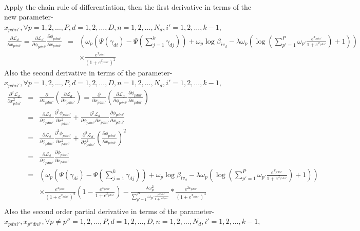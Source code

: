 \documentclass[a4paper]{article}
\newcommand{\be}{\begin{equation}}
\newcommand{\ee}{\end{equation}}
\newcommand{\ba}{\begin{array}}
\newcommand{\ea}{\end{array}}
\begin{document}
\\
Apply the chain rule of differentiation, then the first derivative in terms of the new parameter-$x_{pdni'},\forall p=1,2,\ldots,P,d=1,2,\ldots,D,n=1,2,\ldots,N_d,i'=1,2,\ldots,k-1$,\\
\be
\ba{rcl}
\frac{\partial\mathcal{L}_d}{\partial x_{pdni'}}=\frac{\partial\mathcal{L}_d}{\partial \phi_{pdni'}}\frac{\partial\phi_{pdni'}}{\partial x_{pdni'}}&=&\left(\omega_{p}(\Psi(\gamma_{di})-\Psi(\sum_{j=1}^{k}\gamma_{dj}))+\omega_{p}\log\beta_{iv_d}-\lambda\omega_{p}(\log(\sum_{p'=1}^{P}\omega_{p'}\frac{e^{x_{pdni'}}}{1+e^{x_{pdni'}}})+1)\right)\\
&&\times\frac{e^{x_{pdni'}}}{(1+e^{x_{pdni'}})^2}
\ea
\ee
 Also the second derivative in terms of the parameter-$x_{pdni'},\forall p=1,2,\ldots,P,d=1,2,\ldots,D,n=1,2,\ldots,N_d,i'=1,2,\ldots,k-1$,\\
 \be
 \ba{rcl}
 \frac{\partial^2\mathcal{L}_d}{\partial x_{pdni'}^2}&=&\frac{\partial}{\partial x_{pdni'}}\left(\frac{\partial\mathcal{L}_d}{\partial x_{pdni'}}\right)=\frac{\partial}{\partial x_{pdni'}}\left(\frac{\partial\mathcal{L}_d}{\partial \phi_{pdni'}}\frac{\partial\phi_{pdni'}}{\partial x_{pdni'}}\right)\\
 &=&\frac{\partial\mathcal{L}_d}{\partial \phi_{pdni'}}\frac{\partial^2\phi_{pdni'}}{\partial x_{pdni'}^2}+\frac{\partial^2\mathcal{L}_d}{\partial \phi_{pdni'}\partial x_{pdni'}}\frac{\partial\phi_{pdni'}}{\partial x_{pdni'}}\\
 &=&\frac{\partial\mathcal{L}_d}{\partial \phi_{pdni'}}\frac{\partial^2\phi_{pdni'}}{\partial x_{pdni'}^2}+\frac{\partial^2\mathcal{L}_d}{\partial \phi_{pdni'}^2}(\frac{\partial\phi_{pdni'}}{\partial x_{pdni'}})^2\\
 &=&\frac{\partial\mathcal{L}_d}{\partial \phi_{pdni'}}\frac{\partial\phi_{pdni'}}{\partial x_{pdni'}}\\
 &=&\left(\omega_{p}(\Psi(\gamma_{di})-\Psi(\sum_{j=1}^{k}\gamma_{dj}))+\omega_{p}\log\beta_{iv_d}-\lambda\omega_{p}(\log(\sum_{p'=1}^{P}\omega_{p'}\frac{e^{x_{p'dni'}}}{1+e^{x_{p'dni'}}})+1)\right)\\
 &&\times\frac{e^{x_{pdni'}}}{(1+e^{x_{pdni'}})^2}(1-\frac{e^{x_{pdni'}}}{1+e^{x_{pdni'}}})-\frac{\lambda\omega_p^2}{\sum_{p'=1}^{P}\omega_{p'}\frac{e^{x_{pdni'}}}{1+e^{x_{pdni'}}}}*\frac{e^{2x_{pdni'}}}{(1+e^{x_{pdni'}})^4}\\
 \ea
 \ee
Also the second order partial derivative in terms of the parameter-$x_{pdni'},x_{p''dni'},\forall p\neq p''=1,2,\ldots,P,d=1,2,\ldots,D,n=1,2,\ldots,N_d,i'=1,2,\ldots,k-1$,\\
\end{document}
